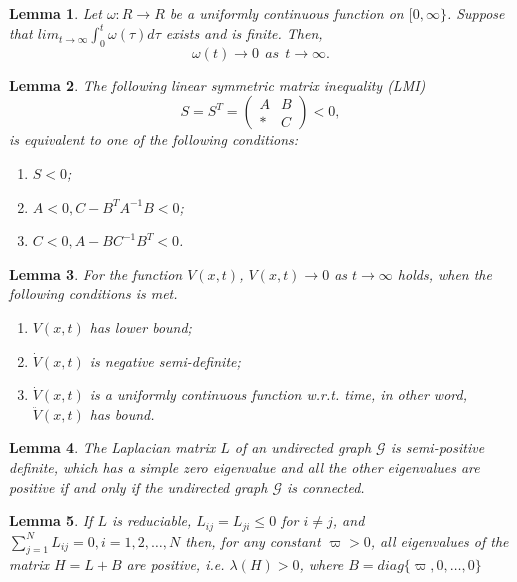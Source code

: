 \documentclass[review]{elsarticle}
\newtheorem{lem}{Lemma}
\begin{document}
\begin{lem}\label{lem3}
	Let $\omega: R \rightarrow R$ be a uniformly continuous function on $[0,\infty \} $. Suppose that  $lim_{t \rightarrow \infty} \int_{0}^{t} \omega (\tau) d \tau$ exists and  is finite. Then,
	$$
	\omega(t) \rightarrow 0~~ as ~~t \rightarrow \infty.
	$$
\end{lem}
\begin{lem}\label{lem-SCHUR}
	The following linear symmetric matrix inequality (LMI)
	\begin{equation*}
	S=S^T=
	\begin{pmatrix}
	A&B\\ *&C
	\end{pmatrix}<0,
	\end{equation*}
	is equivalent to one of the following conditions: 
	\begin{enumerate}
		\item  $S<0$;
		\item  $A<0,C-B^TA^{-1}B<0$;
		\item  $C<0,A-BC^{-1}B^T<0$.
	\end{enumerate}
\end{lem}
\begin{lem}\label{lem-BABA} \cite{Slotine2004Applied}
	For the function $V(x,t)$, $V(x,t) \rightarrow 0$ as $t\rightarrow \infty$ holds, when the following conditions is met.
	\begin{enumerate}
		\item $V(x,t)$ has lower bound;
		\item $\dot V(x,t)$ is negative semi-definite;
		\item $\dot V(x,t)$ is a uniformly continuous function w.r.t. time, in other word, $\ddot V(x,t)$ has bound. 
	\end{enumerate}
\end{lem}
\begin{lem}\label{LEM - L}
	The Laplacian matrix $L$ of an undirected graph $\mathcal{G}$ is semi-positive definite, which has a simple zero eigenvalue and all the other eigenvalues are positive if and only if the undirected graph $\mathcal{G}$ is connected.
\end{lem}
\begin{lem}\label{lem - H}\cite{Chen2007Pinning}
	If $L$ is reduciable, $L_{ij} = L_{ji} \leq 0$ for $i \ne j  $, and $\sum_{j=1}^{N}L_{ij} = 0,i=1,2,\ldots,N$ then, for any constant $\varpi >0$, all eigenvalues of the matrix $H= L+B$ are positive, i.e. $\lambda(H)>0$, where $B = diag\{\varpi,0,\ldots,0\}$ 
\end{lem}
\end{document}
